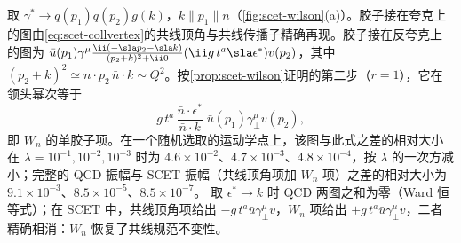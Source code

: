 \begin{example}[$W_n$ 的树图匹配]\label{ex:scet-wn-tree}
取 $\gamma^*\to q(p_1)\bar q(p_2)g(k)$，$k\parallel p_1\parallel n$（\cref{fig:scet-wilson}(a)）。胶子接在夸克上的图由\cref{eq:scet-collvertex}的共线顶角与共线传播子精确再现。胶子接在反夸克上的图为
$\bar u(p_1)\gamma^\mu\frac{\ii(-\sla p_2-\sla k)}{(p_2+k)^2+\ii0}(\ii g\,t^a\sla\epsilon^*)v(p_2)$，其中 $(p_2+k)^2\simeq n\cdot p_2\,\bar n\cdot k\sim Q^2$。按\cref{prop:scet-wilson}证明的第二步（$r=1$），它在领头幂次等于
\[
g\,t^a\,\frac{\bar n\cdot\epsilon^*}{\bar n\cdot k}\;\bar u(p_1)\gamma_\perp^\mu v(p_2),
\]
即 $W_n$ 的单胶子项。在一个随机选取的运动学点上，该图与此式之差的相对大小在 $\lambda=10^{-1},10^{-2},10^{-3}$ 时为 $4.6\times10^{-2}$、$4.7\times10^{-3}$、$4.8\times10^{-4}$，按 $\lambda$ 的一次方减小；完整的 QCD 振幅与 SCET 振幅（共线顶角项加 $W_n$ 项）之差的相对大小为 $9.1\times10^{-3}$、$8.5\times10^{-5}$、$8.5\times10^{-7}$。%
取 $\epsilon^*\to k$ 时 QCD 两图之和为零（Ward 恒等式）；在 SCET 中，共线顶角项给出 $-g\,t^a\bar u\gamma_\perp^\mu v$，$W_n$ 项给出 $+g\,t^a\bar u\gamma_\perp^\mu v$，二者精确相消：$W_n$ 恢复了共线规范不变性。
\end{example}
